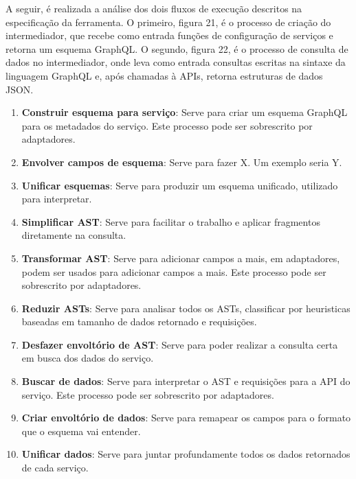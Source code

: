 A seguir, é realizada a análise dos dois fluxos de execução descritos na especificação da ferramenta. O primeiro, figura 21, é o processo de criação do intermediador, que recebe como entrada funções de configuração de serviços e retorna um esquema GraphQL. O segundo, figura 22, é o processo de consulta de dados no intermediador, onde leva como entrada consultas escritas na sintaxe da linguagem GraphQL e, após chamadas à APIs, retorna estruturas de dados JSON.

\begin{enumerate}[noitemsep]
  \item \textbf{Construir esquema para serviço}: Serve para criar um esquema GraphQL para os metadados do serviço. Este processo pode ser sobrescrito por adaptadores.
  \item \textbf{Envolver campos de esquema}: Serve para fazer X. Um exemplo seria Y.
  \item \textbf{Unificar esquemas}: Serve para produzir um esquema unificado, utilizado para interpretar.
  \item \textbf{Simplificar AST}: Serve para facilitar o trabalho e aplicar fragmentos diretamente na consulta.
  \item \textbf{Transformar AST}: Serve para adicionar campos a mais, em adaptadores, podem ser usados para adicionar campos a mais. Este processo pode ser sobrescrito por adaptadores.
  \item \textbf{Reduzir ASTs}: Serve para analisar todos os ASTs, classificar por heuristicas baseadas em tamanho de dados retornado e requisições.
  \item \textbf{Desfazer envoltório de AST}: Serve para poder realizar a consulta certa em busca dos dados do serviço.
  \item \textbf{Buscar de dados}: Serve para interpretar o AST e requisições para a API do serviço. Este processo pode ser sobrescrito por adaptadores.
  \item \textbf{Criar envoltório de dados}: Serve para remapear os campos para o formato que o esquema vai entender.
  \item \textbf{Unificar dados}: Serve para juntar profundamente todos os dados retornados de cada serviço.
\end{enumerate}

